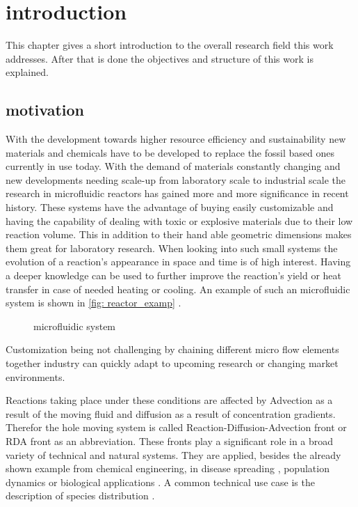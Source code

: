 \documentclass[../thesis.tex]{subfiles}
\begin{document}
\chapter{introduction}
\label{chp:introduction}

This chapter gives a short introduction to the overall research field this work addresses. After that is done the objectives and structure of this work is explained.

\section{motivation}

With the development towards higher resource efficiency and sustainability new materials and chemicals have to be developed to replace the fossil based ones currently in use today. With the demand of materials constantly changing and new developments needing scale-up from laboratory scale to industrial scale the research in microfluidic reactors has gained more and more significance in recent history. These systems have the advantage of buying easily customizable and having the capability of dealing with toxic or explosive materials due to their low reaction volume. This in addition to their hand able geometric dimensions makes them great for laboratory research. When looking into such small systems the evolution of a reaction's appearance in space and time is of high interest. Having a deeper knowledge can be used to further improve the reaction's yield or heat transfer in case of needed heating or cooling. An example of such an microfluidic system is shown in \autoref{fig: reactor_examp} \cite{corning}. 
\begin{figure}[htb]
	\centering
	\qquad
	\caption{microfluidic system}%
	\label{fig: reactor_examp}%
\end{figure}
Customization being not challenging by chaining different micro flow elements together industry can quickly adapt to upcoming research or changing market environments.

Reactions taking place under these conditions are affected by Advection as a result of the moving fluid and diffusion as a result of concentration gradients. Therefor the hole moving system is called Reaction-Diffusion-Advection front or RDA front as an abbreviation.
These fronts play a significant role in a broad variety of technical and natural systems. They are applied, besides the already shown example from chemical engineering, in disease spreading \cite{kuto2017concentration}, population dynamics \cite{chen2018hopf, wang2019persistence} or biological applications \cite{zhao2011operator}. A common technical use case is the description of species distribution \cite{nakagaki1999reaction, von2013measurement}.
\end{document}
